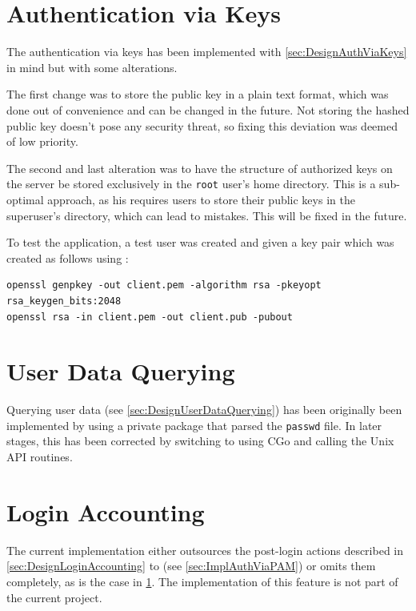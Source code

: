 \documentclass[10pt,a4paper,titlepage,twoside,english,final]{zhawreprt}
\begin{document}
\section{Authentication via Keys}\label{sec:ImplAuthViaKeys}
The authentication via keys has been implemented with \ref{sec:DesignAuthViaKeys} in mind but with some alterations.

The first change was to store the public key in a plain text format, which was done out of convenience and can be changed in the future. Not storing the hashed public key doesn't pose any security threat, so fixing this deviation was deemed of low priority.

The second and last alteration was to have the structure of authorized keys on the server be stored exclusively in the \texttt{root} user's home directory. This is a sub-optimal approach, as his requires users to store their public keys in the superuser's directory, which can lead to mistakes. This will be fixed in the future.

To test the application, a test user was created and given a key pair which was created as follows using \cite{openssl}:
\setlistingBash
\begin{lstlisting}[caption={Generating a key pair for the client},label=lst:GenClientKeyPair]
openssl genpkey -out client.pem -algorithm rsa -pkeyopt rsa_keygen_bits:2048
openssl rsa -in client.pem -out client.pub -pubout
\end{lstlisting}

\section{User Data Querying}\label{sec:ImplUserDataQuerying}
Querying user data (see \ref{sec:DesignUserDataQuerying}) has been originally been implemented by using a private package that parsed the \texttt{passwd} file. In later stages, this has been corrected by switching to using \gls{CGo} and calling the \gls{Unix} \gls{API} routines.

\section{Login Accounting}\label{sec:ImplLoginAccounting}
The current implementation either outsources the post-login actions described in \ref{sec:DesignLoginAccounting} to \cite{login}(see \ref{sec:ImplAuthViaPAM}) or omits them completely, as is the case in \ref{sec:ImplAuthViaKeys}. The implementation of this feature is not part of the current project.
\end{document}
